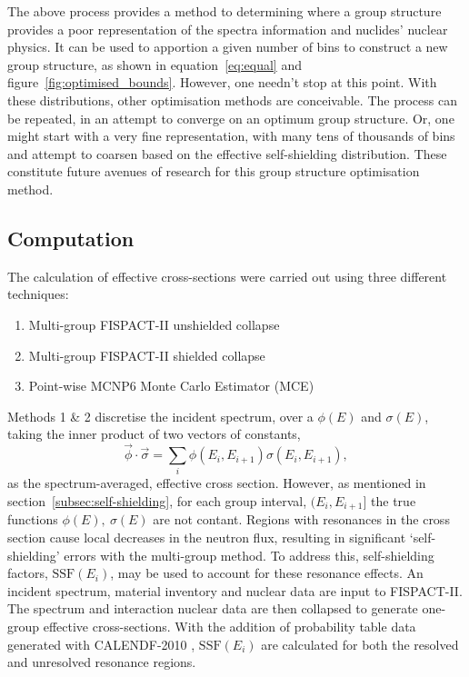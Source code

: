 The above process provides a method to determining where a group structure provides a poor representation of the spectra information and nuclides' nuclear physics. It can be used to apportion a given number of bins to construct a new group structure, as shown in equation~\ref{eq:equal} and figure~\ref{fig:optimised_bounds}. However, one needn't stop at this point. With these distributions, other optimisation methods are conceivable. The process can be repeated, in an attempt to converge on an optimum group structure. Or, one might start with a very fine representation, with many tens of thousands of bins and attempt to coarsen based on the effective self-shielding distribution. These constitute future avenues of research for this group structure optimisation method.

\FloatBarrier

\subsection{Computation}
\label{subsec:computation}
The calculation of effective cross-sections were carried out using three different techniques:

\begin{enumerate}
  \item Multi-group FISPACT-II unshielded collapse
  \item Multi-group FISPACT-II shielded collapse
  \item Point-wise MCNP6 Monte Carlo Estimator (MCE)
\end{enumerate}

Methods 1 \& 2 discretise the incident spectrum, over a  $\phi(E)$ and $\sigma(E)$, taking the inner product of two vectors of constants,
$$\vec{\phi} \cdot \vec{\sigma} = \sum_i \phi(E_i , E_{i+1}) \sigma(E_i , E_{i+1}),$$
as the spectrum-averaged, effective cross section. However, as mentioned in section~\ref{subsec:self-shielding}, for each group interval, $(E_{i}, E_{i+1}]$ the true functions $\phi(E),\ \sigma(E)$ are not contant. Regions with resonances in the cross section cause local decreases in the neutron flux, resulting in significant `self-shielding' errors with the multi-group method. To address this, self-shielding factors, $\mathrm{SSF}(E_i)$, may be used to account for these resonance effects. An incident spectrum, material inventory and nuclear data are input to FISPACT-II. The spectrum and interaction nuclear data are then collapsed to generate one-group effective cross-sections. With the addition of probability table data generated with CALENDF-2010 \cite{sublet2011}, $\mathrm{SSF}(E_i)$ are calculated for both the resolved and unresolved resonance regions.

